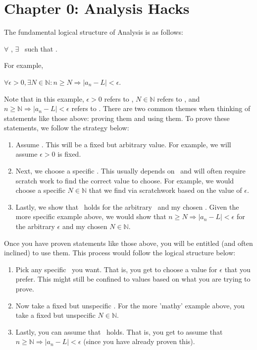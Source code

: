 \documentclass{article}
\begin{document}
\section*{Chapter 0: Analysis Hacks}

The fundamental logical structure of Analysis is as follows:
\begin{center}
    $\forall$ \phone, $\exists$ \smiley \ such that \textleaf .
\end{center}

For example,
\begin{center}
    $\forall \epsilon > 0, \exists N \in \mathbb{N}: n \geq N \Longrightarrow |a_n-L|<\epsilon$.
\end{center}

Note that in this example, $\epsilon>0$ refers to \phone, $N \in \mathbb{N}$ refers to \smiley, and $n\geq\mathbb{N} \Longrightarrow |a_n-L|<\epsilon$ refers to \textleaf. There are two common themes when thinking of statements like those above: proving them and using them. To prove these statements, we follow the strategy below:

\begin{enumerate}
    \item Assume \phone. This will be a fixed but arbitrary value. For example, we will assume $\epsilon>0$ is fixed.
    \item Next, we choose a specific \smiley. This usually depends on \phone \ and will often require scratch work to find the correct value to choose. For example, we would choose a specific $N \in \mathbb{N}$ that we find via scratchwork based on the value of $\epsilon$.
    \item Lastly, we show that \textleaf \ holds for the arbitrary \phone \ and my chosen \smiley. Given the more specific example above, we would show that $n \geq N \Longrightarrow |a_n-L|<\epsilon$ for the arbitrary $\epsilon$ and my chosen $N \in \mathbb{N}$.
\end{enumerate}

Once you have proven statements like those above, you will be entitled (and often inclined) to use them. This process would follow the logical structure below:

\begin{enumerate}
    \item Pick any specific \phone \ you want. That is, you get to choose a value for $\epsilon$ that you prefer. This might still be confined to values based on what you are trying to prove.
    \item Now take a fixed but unspecific \smiley. For the more 'mathy' example above, you take a fixed but unspecific $N \in \mathbb{N}$.
    \item Lastly, you can assume that \textleaf \ holds. That is, you get to assume that $n \geq \mathbb{N} \Longrightarrow |a_n-L|<\epsilon$ (since you have already proven this).
\end{enumerate}
\end{document}
